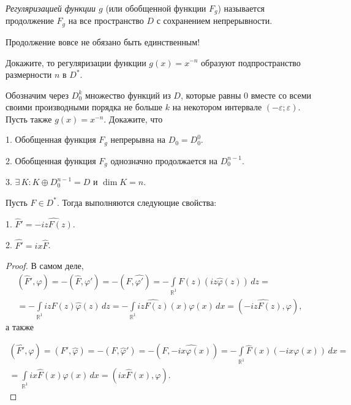 \documentclass[10pt]{article}
\begin{document}
\begin{df}
\emph{Регуляризацией функции $g$} (или обобщенной функции $F_g$)
называется продолжение $F_g$ на все пространство $D$ с сохранением
непрерывности.
\end{df}

\begin{note}
Продолжение вовсе не обязано быть единственным!
\end{note}

\begin{problem}
Докажите, то регуляризации функции $g(x)=x^{-n}$ образуют
подпространство размерности $n$ в $D^*$.
\end{problem}

\begin{problem}
Обозначим через $D_0^k$ множество функций из $D$, которые равны 0
вместе со всеми своими производными порядка не больше $k$ на
некотором интервале $(-\varepsilon;\varepsilon)$. Пусть также
$g(x)=x^{-n}$. Докажите, что

1. Обобщенная функция $F_g$ непрерывна на $D_0=D_0^0$.

2. Обобщенная функция $F_g$ однозначно продолжается на $D_0^{n-1}$.

3. $\exists\,K:K\oplus D_0^{n-1}=D$ и $\dim K=n$.
\end{problem}

\begin{theorem}
Пусть $F\in D^*$. Тогда выполняются следующие свойства:

1. $\hat{F}'=\widehat{-iz F(z)}$.

2. $\widehat{F'}=ix\hat{F}$.
\end{theorem}

\begin{proof}
В самом деле,
\begin{multline*}
(\hat{F}',\varphi)=-(\hat{F},\varphi')=-(F,\widehat{\varphi'})=-\int\limits_{\mathbb{R}^1}\!
F(z)(iz\hat{\varphi}(z))\,dz=\\=
-\int\limits_{\mathbb{R}^1}\!izF(z)\hat{\varphi}(z)\,dz=-\int\limits_{\mathbb{R}^1}\!
\widehat{izF(z)}(x)\varphi(x)\,dx=(\widehat{-izF(z)},\varphi),
\end{multline*}
а также

\begin{multline*}
(\widehat{F'},\varphi)=(F',\hat{\varphi})=-(F,\hat{\varphi}')=-(F,\widehat{-ix\varphi(x)})=
-\int\limits_{\mathbb{R}^1}\!\hat{F}(x)(-ix\varphi(x))\,dx=\\=
\int\limits_{\mathbb{R}^1}\!ix\hat{F}(x)\varphi(x)\,dx=(ix\hat{F}(x),\varphi).
\end{multline*}
\end{proof}
\end{document}
